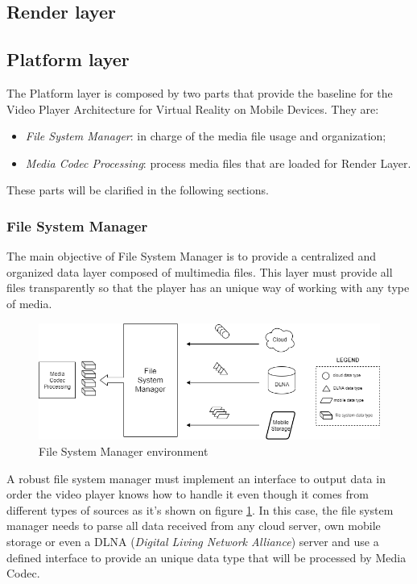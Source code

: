 \documentclass[runningheads]{llncs}
\begin{document}
\subsection{Render layer}

\subsection{Platform layer}
The Platform layer is composed by two parts that provide the baseline for the Video Player Architecture for Virtual Reality on Mobile Devices. They are:

\begin{itemize}
    \item \textit{File System Manager}: in charge of the media file usage and organization;
    \item \textit{Media Codec Processing}: process media files that are loaded for Render Layer.
\end{itemize}

These parts will be clarified in the following sections.

\subsubsection{File System Manager}

The main objective of File System Manager is to provide a centralized and organized data layer composed of multimedia files. This layer must provide all files transparently so that the player has an unique way of working with any type of media.

\begin{figure}[h!]
    \centerline{\includegraphics[scale=0.5]{images/file_system2.png}}
    \caption{File System Manager environment}
    \label{fig-file-system}
\end{figure}

A robust file system manager must implement an interface to output data in order the video player knows how to handle it even though it comes from different types of sources as it's shown on figure \ref{fig-file-system}. In this case,
the file system manager needs to parse all data received from any cloud server, own mobile storage or even a DLNA (\textit{Digital Living Network Alliance}) server and use a defined interface to provide an unique data type that will be processed by Media Codec.
\end{document}
